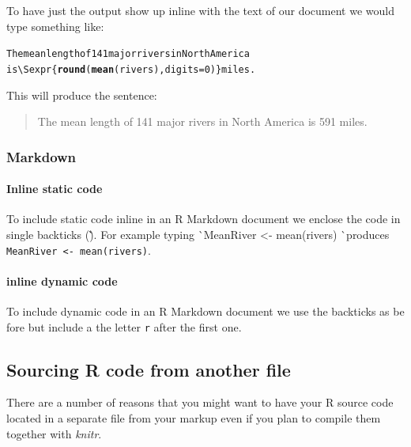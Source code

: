 \documentclass[ChapterTOCs,krantz1]{krantz}\usepackage{graphicx, color}
\makeatletter
\newcommand{\hlfunctioncall}[1]{\textcolor[rgb]{0.501960784313725,0,0.329411764705882}{\textbf{#1}}}%
\newenvironment{kframe}{%
 \def\at@end@of@kframe{}%
 \ifinner\ifhmode%
  \def\at@end@of@kframe{\end{minipage}}%
  \begin{minipage}{\columnwidth}%
 \fi\fi%
 \def\FrameCommand##1{\hskip\@totalleftmargin \hskip-\fboxsep
 \colorbox{shadecolor}{##1}\hskip-\fboxsep
     \hskip-\linewidth \hskip-\@totalleftmargin \hskip\columnwidth}%
 \MakeFramed {\advance\hsize-\width
   \@totalleftmargin\z@ \linewidth\hsize
   \@setminipage}}%
 {\par\unskip\endMakeFramed%
 \at@end@of@kframe}
\newenvironment{knitrout}{}{} %
\makeatother
\begin{document}
\noindent To have just the output show up inline with the text of our document we would type something like:

\begin{knitrout}
\color{fgcolor}\begin{kframe}
\begin{alltt}
The mean length of 141 major rivers in North America
is \textbackslash{}Sexpr\{\hlfunctioncall{round}(\hlfunctioncall{mean}(rivers), digits = 0)\} miles. 
\end{alltt}
\end{kframe}
\end{knitrout}


\noindent This will produce the sentence:

\begin{quote}
    The mean length of 141 major rivers in North America is 591 miles. 
\end{quote}

\subsubsection{Markdown}

\paragraph{Inline static code}

To include static code inline in an R Markdown document we enclose the code in single backticks (\` \`). For example typing \`\ MeanRiver \textless- mean(rivers) \`\ produces {\tt{MeanRiver \textless- mean(rivers)}}.

\paragraph{inline dynamic code}

To include dynamic code in an R Markdown document we use the backticks as be fore but include a the letter \texttt{r} after the first one.

\subsection{Sourcing R code from another file}

There are a number of reasons that you might want to have your R source code located in a separate file from your markup even if you plan to compile them together with {\emph{knitr}}.
\end{document}
